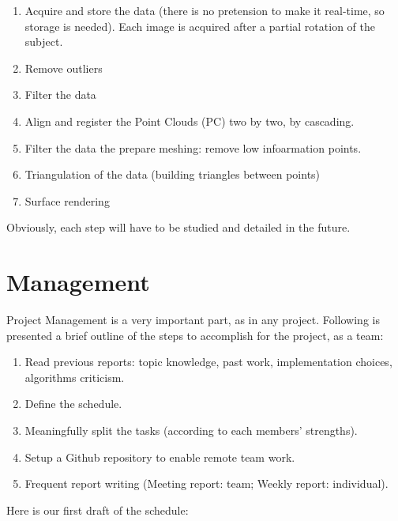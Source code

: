 \documentclass[aps,letterpaper,11pt]{revtex4}
\begin{document}
\begin{enumerate}
\item Acquire and store the data (there is no pretension to make it real-time, so storage is needed). Each image is acquired after a partial rotation of the subject.
\item Remove outliers 
\item Filter the data
\item Align and register the Point Clouds (PC) two by two, by cascading.
\item Filter the data the prepare meshing: remove low infoarmation points.
\item Triangulation of the data (building triangles between points)
\item Surface rendering 
\end{enumerate}

Obviously, each step will have to be studied and detailed in the future.

\section{Management}
Project Management is a very important part, as in any project. 
Following is presented a brief outline of the steps to accomplish for the project, as a team:

\begin{enumerate}
\item Read previous reports: topic knowledge, past work, implementation choices, algorithms criticism.
\item Define the schedule.
\item Meaningfully split the tasks (according to each members' strengths).
\item Setup a Github repository to enable remote team work.
\item Frequent report writing (Meeting report: team; Weekly report: individual).
\end{enumerate}

Here is our first draft of the schedule:
\end{document}
